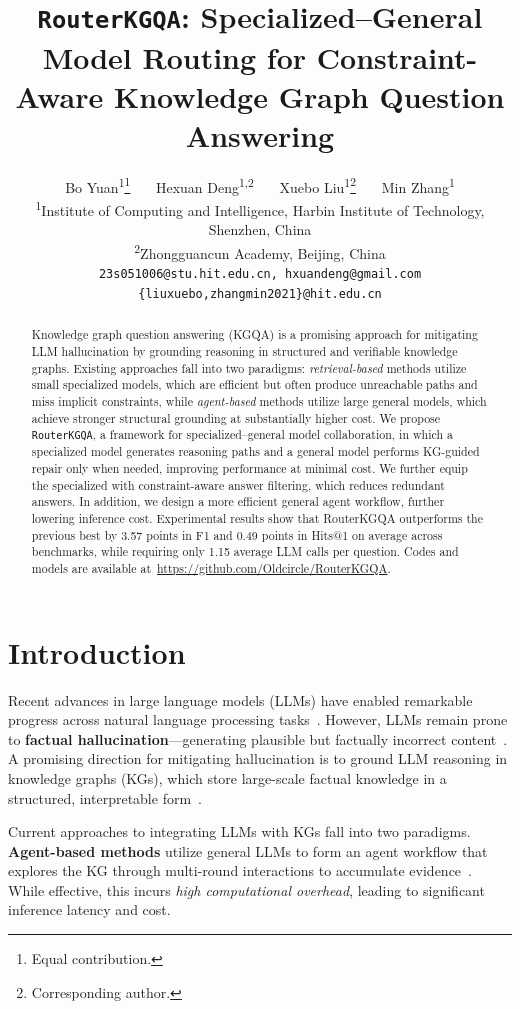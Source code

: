 \documentclass[11pt]{article}
\title{\texttt{RouterKGQA}: Specialized--General Model Routing for Constraint-Aware Knowledge Graph Question Answering}
\author{
  Bo Yuan\textsuperscript{\rm 1}\thanks{Equal contribution.}~~~
  Hexuan Deng\textsuperscript{\rm 1,2}\footnotemark[1]~~~
  Xuebo Liu\textsuperscript{\rm 1}\thanks{Corresponding author.}~~~
  Min Zhang\textsuperscript{\rm 1}
  \\
  \textsuperscript{\rm 1}Institute of Computing and Intelligence, Harbin Institute of Technology, Shenzhen, China
  \\
  \textsuperscript{\rm 2}Zhongguancun Academy, Beijing, China
  \\
  \texttt{23s051006@stu.hit.edu.cn, hxuandeng@gmail.com}
  \\
  \texttt{\{liuxuebo,zhangmin2021\}@hit.edu.cn}
}
\begin{document}
\maketitle
\begin{abstract}
Knowledge graph question answering (KGQA) is a promising approach for mitigating LLM hallucination by grounding reasoning in structured and verifiable knowledge graphs. Existing approaches fall into two paradigms: \emph{retrieval-based} methods utilize small specialized models, which are efficient but often produce unreachable paths and miss implicit constraints, while \emph{agent-based} methods utilize large general models, which achieve stronger structural grounding at substantially higher cost. We propose \texttt{RouterKGQA}, a framework for specialized--general model collaboration, in which a specialized model generates reasoning paths and a general model performs KG-guided repair only when needed, improving performance at minimal cost. We further equip the specialized with constraint-aware answer filtering, which reduces redundant answers. In addition, we design a more efficient general agent workflow, further lowering inference cost. Experimental results show that RouterKGQA outperforms the previous best by 3.57 points in F1 and 0.49 points in Hits@1 on average across benchmarks, while requiring only 1.15 average LLM calls per question. Codes and models are available at~\url{https://github.com/Oldcircle/RouterKGQA}.
\end{abstract}


\section{Introduction}
\label{sec:introduction}

Recent advances in large language models (LLMs) have enabled remarkable progress across natural language processing tasks~\citep{achiam2023gpt4,grattafiori2024llama3}. However, LLMs remain prone to \textbf{factual hallucination}---generating plausible but factually incorrect content~\citep{wagner-etal-2025-mitigating}. A promising direction for mitigating hallucination is to ground LLM reasoning in knowledge graphs (KGs), which store large-scale factual knowledge in a structured, interpretable form~\citep{bollacker2008freebase,ji-etal-2024-retrieval,sui-etal-2025-fidelis}.

Current approaches to integrating LLMs with KGs fall into two paradigms. \textbf{Agent-based methods} utilize general LLMs to form an agent workflow that explores the KG through multi-round interactions to accumulate evidence~\citep{sun2024think-on-graph,chen2024plan-on-graph,dong-etal-2025-effiqa}. While effective, this incurs \emph{high computational overhead}, leading to significant inference latency and cost.
\end{document}
